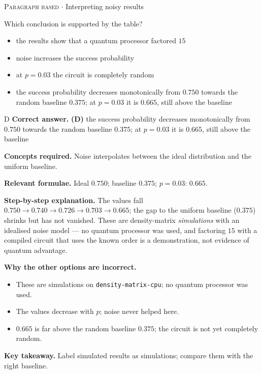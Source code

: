 \documentclass[11pt,a4paper]{article}
\newcommand{\optlabel}[1]{\textbf{(#1)}}
\newcommand{\correctlabel}[1]{\textcolor{okgreen}{\textbf{(#1)}\,\ding{51}}}
\newenvironment{qitem}[1]{\begin{list}{}{\setlength{\leftmargin}{3.3em}\setlength{\labelwidth}{3.1em}%
  \setlength{\labelsep}{0.2em}\setlength{\topsep}{3pt}\setlength{\parsep}{3pt}}\item[\textbf{Q.#1}\hfill]}{\end{list}}
\newcommand{\qsep}{\par\vspace{2pt}{\color{black!15}\hrule}\vspace{4pt}}
\newcommand{\qmeta}[2]{{\footnotesize\color{black!60}\textsc{#1} \;$\cdot$\; #2}\par}
\begin{document}
\begin{qitem}{80}
\qmeta{Paragraph based}{Interpreting noisy results}
Which conclusion is supported by the table?
\begin{itemize}[leftmargin=2.6em, labelsep=0.4em, itemsep=2pt, topsep=3pt]
\item[\optlabel{A}] the results show that a quantum processor factored $15$
\item[\optlabel{B}] noise increases the success probability
\item[\optlabel{C}] at $p = 0.03$ the circuit is completely random
\item[\correctlabel{D}] the success probability decreases monotonically from $0.750$ towards the random baseline $0.375$; at $p = 0.03$ it is $0.665$, still above the baseline
\end{itemize}
\end{qitem}
\begin{solbox}{D}
\textbf{\color{brand}Correct answer.} \textcolor{okgreen}{\textbf{(D)}} the success probability decreases monotonically from $0.750$ towards the random baseline $0.375$; at $p = 0.03$ it is $0.665$, still above the baseline

\textbf{\color{brand}Concepts required.} Noise interpolates between the ideal distribution and the uniform baseline.

\textbf{\color{brand}Relevant formulae.} Ideal $0.750$; baseline $0.375$; $p = 0.03$: $0.665$.

\textbf{\color{brand}Step-by-step explanation.} The values fall $0.750 \to 0.740 \to 0.726 \to 0.703 \to 0.665$; the gap to the uniform baseline ($0.375$) shrinks but has not vanished. These are
density-matrix \emph{simulations} with an idealised noise model --- no quantum processor was used, and factoring $15$ with a compiled circuit that uses the known
order is a demonstration, not evidence of quantum advantage.

\textbf{\color{brand}Why the other options are incorrect.}
\begin{itemize}[leftmargin=2.4em, itemsep=1pt, topsep=2pt]
\item[\textbf{(A)}] These are simulations on \texttt{density-matrix-cpu}; no quantum processor was used.
\item[\textbf{(B)}] The values decrease with $p$; noise never helped here.
\item[\textbf{(C)}] $0.665$ is far above the random baseline $0.375$; the circuit is not yet completely random.
\end{itemize}
\textbf{\color{brand}Key takeaway.} Label simulated results as simulations; compare them with the right baseline.
\end{solbox}
\qsep
\end{document}
